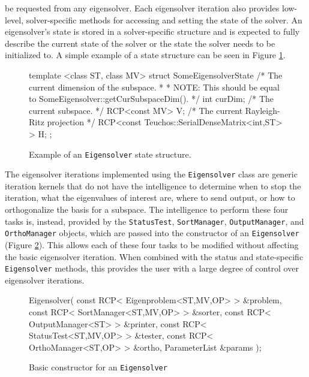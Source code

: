 \documentclass[acmtoms,acmnow]{acmtrans2m}
\newcommand{\aspace}[1]{\texttt{#1}}
\begin{document}
be requested from any eigensolver.  Each eigensolver iteration also provides low-level, 
solver-specific methods for accessing and setting the state of the solver.  
An eigensolver's state is stored in a solver-specific structure and is expected to fully describe 
the current state of the solver or the state the solver needs to be initialized to.  
A simple example of a state structure can be seen in Figure \ref{fig:state}.
\begin{figure}[htb]
\begin{center}
\begin{boxedverbatim}
  template <class ST, class MV>
  struct SomeEigensolverState {
    /* The current dimension of the subspace.                              *
     * NOTE: This should be equal to SomeEigensolver::getCurSubspaceDim(). */
    int curDim;
    /* The current subspace. */
    RCP<const MV> V;
    /* The current Rayleigh-Ritz projection */
    RCP<const Teuchos::SerialDenseMatrix<int,ST> > H;
  };
\end{boxedverbatim}
\end{center}
\caption{Example of an \aspace{Eigensolver} state structure.}
\label{fig:state}
\end{figure}

The eigensolver iterations implemented using the \aspace{Eigensolver} class
are generic iteration kernels that do not have the intelligence to determine when
to stop the iteration, what the eigenvalues of interest are, where to send output,
or how to orthogonalize the basis for a subspace.  The intelligence to perform these four
tasks is, instead, provided by the \aspace{StatusTest}, \aspace{SortManager},
\aspace{OutputManager}, and \aspace{OrthoManager} objects, which are passed into the
constructor of an \aspace{Eigensolver} (Figure \ref{fig:constructor}).  This allows 
each of these four tasks to be modified without affecting the basic eigensolver 
iteration. When combined with the status and state-specific \aspace{Eigensolver} 
methods, this provides the user with a large degree of control over eigensolver iterations.
\begin{figure}[htb]
\begin{center}
\begin{boxedverbatim}
Eigensolver(
   const RCP< Eigenproblem<ST,MV,OP> > &problem,
   const RCP< SortManager<ST,MV,OP>  > &sorter,
   const RCP< OutputManager<ST>      > &printer,
   const RCP< StatusTest<ST,MV,OP>   > &tester,
   const RCP< OrthoManager<ST,OP>    > &ortho,
   ParameterList                       &params
 );
\end{boxedverbatim}
\end{center}
\caption{Basic constructor for an \aspace{Eigensolver}}
\label{fig:constructor}
\end{figure}
\end{document}
